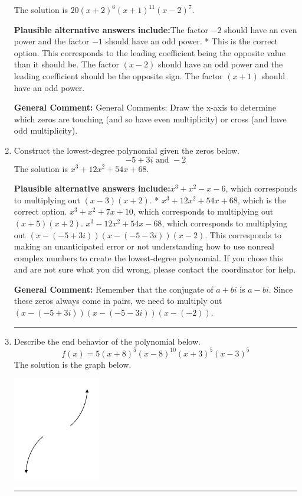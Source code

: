 \documentclass{extbook}[14pt]
\newcommand{\litem}[1]{\item #1

\rule{\textwidth}{0.4pt}}
\begin{document}
\begin{enumerate}
{The solution is \( 20(x + 2)^{6} (x + 1)^{11} (x - 2)^{7} \).\begin{enumerate}[label=\Alph*.]
\textbf{Plausible alternative answers include:}The factor $-2$ should have an even power and the factor $-1$ should have an odd power.
* This is the correct option.
This corresponds to the leading coefficient being the opposite value than it should be.
The factor $(x - 2)$ should have an odd power and the leading coefficient should be the opposite sign.
The factor $(x + 1)$ should have an odd power.
\end{enumerate}

\textbf{General Comment:} General Comments: Draw the x-axis to determine which zeros are touching (and so have even multiplicity) or cross (and have odd multiplicity).
}
\litem{
Construct the lowest-degree polynomial given the zeros below.
\[ -5 + 3 i \text{ and } -2 \]The solution is \( x^{3} +12 x^{2} +54 x + 68 \).\begin{enumerate}[label=\Alph*.]
\textbf{Plausible alternative answers include:}$x^{3} + x^{2} -x -6$, which corresponds to multiplying out $(x -3)(x + 2)$.
* $x^{3} +12 x^{2} +54 x + 68$, which is the correct option.
$x^{3} + x^{2} +7 x + 10$, which corresponds to multiplying out $(x + 5)(x + 2)$.
$x^{3} -12 x^{2} +54 x -68$, which corresponds to multiplying out $(x-(-5 + 3 i))(x-(-5 - 3 i))(x -2)$.
This corresponds to making an unanticipated error or not understanding how to use nonreal complex numbers to create the lowest-degree polynomial. If you chose this and are not sure what you did wrong, please contact the coordinator for help.
\end{enumerate}

\textbf{General Comment:} Remember that the conjugate of $a+bi$ is $a-bi$. Since these zeros always come in pairs, we need to multiply out $(x-(-5 + 3 i))(x-(-5 - 3 i))(x-(-2))$.
}
\litem{
Describe the end behavior of the polynomial below.
\[ f(x) = 5(x + 8)^{5}(x - 8)^{10}(x + 3)^{5}(x - 3)^{5} \]The solution is the graph below.
    \begin{center}
        \includegraphics[width=0.3\textwidth]{../Figures/polyEndBehaviorDA.png}
    \end{center}

}
\end{enumerate}
\end{document}

